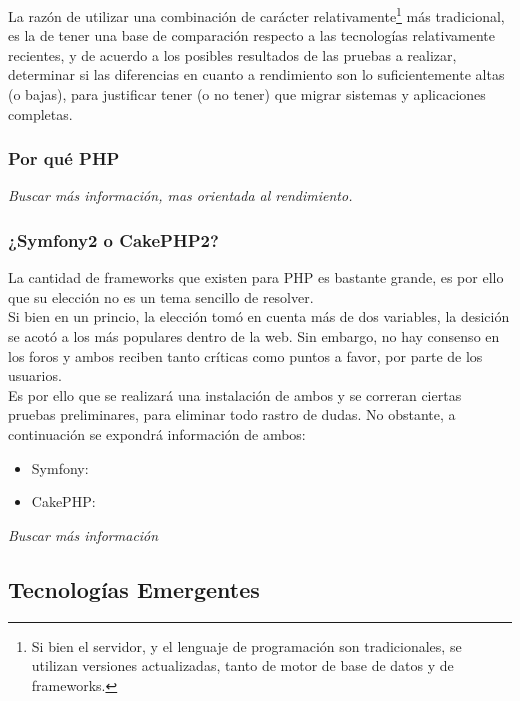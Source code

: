 La razón de utilizar una combinación de carácter relativamente\footnote{Si bien el servidor, y el lenguaje 
de programación son tradicionales, se utilizan versiones actualizadas, tanto de motor de base de datos y de 
frameworks.} más tradicional, es la de tener una base de comparación respecto a las tecnologías relativamente 
recientes, y de acuerdo a los posibles resultados de las pruebas a realizar, determinar si las diferencias 
en cuanto a rendimiento son lo suficientemente altas (o bajas), para justificar tener (o no tener) que 
migrar sistemas y aplicaciones completas.\\


\subsubsection{Por qué PHP}
\textit{Buscar más información, mas orientada al rendimiento.}


\subsubsection{¿Symfony2 o CakePHP2?}

La cantidad de frameworks que existen para PHP es bastante grande, es por ello que su elección no es un
tema sencillo de resolver.\\

Si bien en un princio, la elección tomó en cuenta más de dos variables, la desición se acotó a los más
populares dentro de la web. Sin embargo, no hay consenso en los foros y ambos reciben tanto críticas como 
puntos a favor, por parte de los usuarios.\\

Es por ello que se realizará una instalación de ambos y se correran ciertas pruebas preliminares, para eliminar
todo rastro de dudas. No obstante, a continuación  se expondrá información de ambos:

\begin{itemize}
 \item Symfony:
 \item CakePHP:
\end{itemize}


\textit{Buscar más información}

\subsection{Tecnologías Emergentes}

